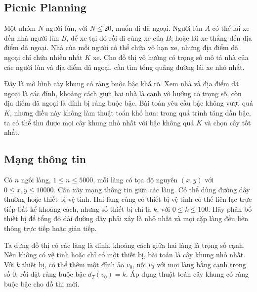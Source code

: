 \documentclass[11pt]{article}
\begin{document}
\subsection{Picnic Planning}

Một nhóm $N$ người lùn, với $N\le 20$, muốn đi dã ngoại. Người lùn $A$ có thể
lái xe đến nhà người lùn $B$, để xe tại đó rồi đi cùng xe của $B$; hoặc lái xe
thẳng đến địa điểm dã ngoại. Nhà của mỗi người có thể chứa vô hạn xe, nhưng
địa điểm dã ngoại chỉ chứa nhiều nhất $K$ xe. Cho đồ thị vô hướng có trọng số
mô tả nhà của các người lùn và địa điểm dã ngoại, cần tìm tổng quãng đường
lái xe nhỏ nhất.

Đây là mô hình cây khung có ràng buộc bậc khá rõ. Xem nhà và địa điểm dã ngoại
là các đỉnh, khoảng cách giữa hai nhà là cạnh vô hướng có trọng số, còn địa
điểm dã ngoại là đỉnh bị ràng buộc bậc. Bài toán yêu cầu bậc không vượt quá
$K$, nhưng điều này không làm thuật toán khó hơn: trong quá trình tăng dần
bậc, ta có thể thu được mọi cây khung nhỏ nhất với bậc không quá $K$ và chọn
cây tốt nhất.

\subsection{Mạng thông tin}

Có $n$ ngôi làng, $1\le n\le 5000$, mỗi làng có tọa độ nguyên $(x,y)$ với
$0\le x,y\le 10000$. Cần xây mạng thông tin giữa các làng. Có thể dùng đường
dây thường hoặc thiết bị vệ tinh. Hai làng cùng có thiết bị vệ tinh có thể
liên lạc trực tiếp bất kể khoảng cách, nhưng số thiết bị chỉ là $k$, với
$0\le k\le 100$. Hãy phân bổ thiết bị để tổng độ dài đường dây phải xây là
nhỏ nhất và mọi cặp làng đều liên thông trực tiếp hoặc gián tiếp.

Ta dựng đồ thị có các làng là đỉnh, khoảng cách giữa hai làng là trọng số
cạnh. Nếu không có vệ tinh hoặc chỉ có một thiết bị, bài toán là cây khung nhỏ
nhất. Với $k$ thiết bị, có thể thêm một đỉnh ảo $v_0$, nối $v_0$ với mọi làng
bằng cạnh trọng số $0$, rồi đặt ràng buộc bậc $d_T(v_0)=k$. Áp dụng thuật toán
cây khung có ràng buộc bậc cho đồ thị mới.
\end{document}

